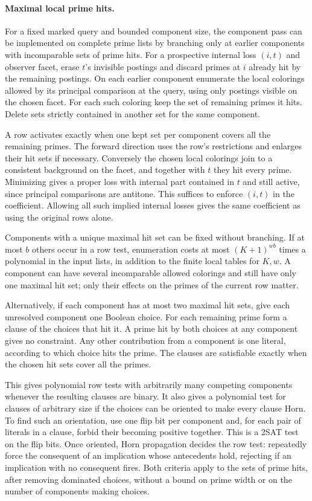 \paragraph{Maximal local prime hits.}
For a fixed marked query and bounded component size, the
component pass can be implemented on complete prime lists
by branching only at earlier components with incomparable
sets of prime hits. For a prospective internal loss $(i,t)$
and observer facet, erase $t$'s invisible postings and
discard primes at $i$ already hit by the remaining postings.
On each earlier component enumerate the local colorings
allowed by its principal comparison at the query, using
only postings visible on the chosen facet. For each such
coloring keep the set of remaining primes it hits. Delete
sets strictly contained in another set for the same component.

A row activates exactly when one kept set per component
covers all the remaining primes. The forward direction
uses the row's restrictions and enlarges their hit sets
if necessary. Conversely the chosen local colorings join
to a consistent background on the facet, and together
with $t$ they hit every prime. Minimizing gives a proper
loss with internal part contained in $t$ and still active,
since principal comparisons are antitone. This suffices
to enforce $(i,t)$ in the coefficient. Allowing all such
implied internal losses gives the same coefficient as
using the original rows alone.

Components with a unique maximal hit set can be fixed
without branching. If at most $b$ others occur in a
row test, enumeration costs at most $(K+1)^{wb}$ times
a polynomial in the input lists, in addition to the
finite local tables for $K,w$. A component can have
several incomparable allowed colorings and still have
only one maximal hit set; only their effects on the
primes of the current row matter.

Alternatively, if each component has at most two maximal
hit sets, give each unresolved component one Boolean choice.
For each remaining prime form a clause of the choices that
hit it. A prime hit by both choices at any component gives
no constraint. Any other contribution from a component is
one literal, according to which choice hits the prime.
The clauses are satisfiable exactly when the chosen hit
sets cover all the primes.

This gives polynomial row tests with arbitrarily many
competing components whenever the resulting clauses are
binary. It also gives a polynomial test for clauses of
arbitrary size if the choices can be oriented to make
every clause Horn. To find such an orientation, use one
flip bit per component and, for each pair of literals
in a clause, forbid their becoming positive together.
This is a 2SAT test on the flip bits. Once oriented,
Horn propagation decides the row test: repeatedly force
the consequent of an implication whose antecedents hold,
rejecting if an implication with no consequent fires.
Both criteria apply to the sets of prime hits, after
removing dominated choices, without a bound on prime
width or on the number of components making choices.

